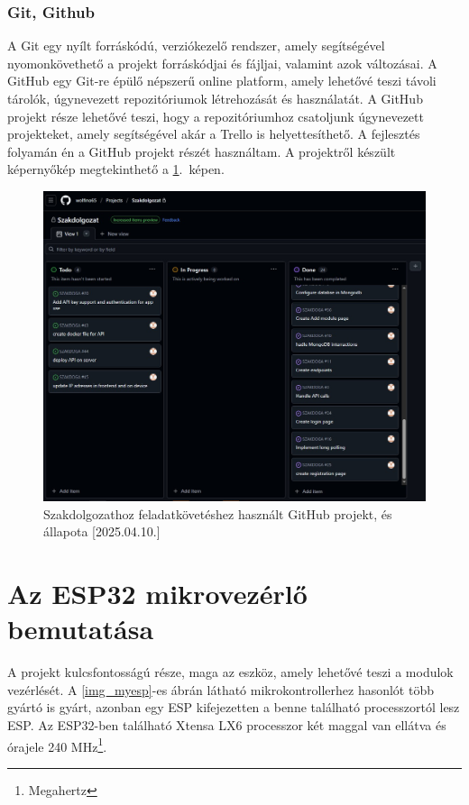 \documentclass{thesis-ekf}
\theoremstyle{definition}
\theoremstyle{remark}
\begin{document}
	\subsection{Git, Github}
	A Git egy nyílt forráskódú, verziókezelő rendszer, amely segítségével nyomonkövethető a projekt forráskódjai és fájljai, valamint azok változásai. A GitHub egy Git-re épülő népszerű online platform, amely lehetővé teszi távoli tárolók, úgynevezett repozitóriumok létrehozását és használatát. A GitHub projekt része lehetővé teszi, hogy a repozitóriumhoz csatoljunk úgynevezett projekteket, amely segítségével akár a Trello is helyettesíthető. A fejlesztés folyamán én a GitHub projekt részét használtam. A projektről készült képernyőkép megtekinthető a \ref{img_git}.~képen.
	\begin{figure}[!ht]
		\centering
		\includegraphics[width=15cm]{github_project}
		\caption{Szakdolgozathoz feladatkövetéshez használt GitHub projekt, és állapota [2025.04.10.]}
		\label{img_git}
	\end{figure}
	\chapter{Az ESP32 mikrovezérlő bemutatása}
	\label{ch_esp}
	A projekt kulcsfontosságú része, maga az eszköz, amely lehetővé teszi a modulok vezérlését. A \ref{img_myesp}-es ábrán látható mikrokontrollerhez hasonlót több gyártó is gyárt, azonban egy ESP kifejezetten a benne található processzortól lesz ESP. Az ESP32-ben található Xtensa LX6 processzor két maggal van ellátva és órajele 240 MHz\footnote{Megahertz}.
\end{document}
